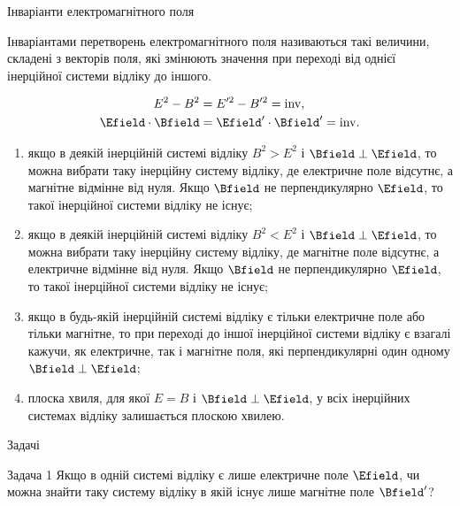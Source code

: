 \documentclass[]{beamer}
\begin{document}
\begin{frame}{Інваріанти електромагнітного поля}{}
	\begin{block}{}\justifying\small
		Інваріантами перетворень електромагнітного поля називаються такі величини, складені з векторів поля, які змінюють значення при переході від однієї інерційної системи відліку до іншого.
	\end{block}
	\begin{tcolorbox}[sharp corners, colframe=blue!50!black, colback=white,  top=0pt]
		{\color{blue}
			\begin{align*}
				E^2 - B^2           & = E'^2 - B'^2 = \mathrm{inv},           \\
				\Efield\cdot\Bfield & = \Efield'\cdot\Bfield' = \mathrm{inv}.
			\end{align*}
		}
	\end{tcolorbox}
	\begin{enumerate}\footnotesize
		\item якщо в деякій інерційній системі відліку {\color{red} $ B^2 > E^2 $}  і {\color{blue} $ \Bfield \perp \Efield $}, то можна вибрати таку інерційну систему відліку, де електричне поле відсутнє, а магнітне відмінне від нуля. Якщо $ \Bfield $ не перпендикулярно $ \Efield $, то такої інерційної системи відліку не існує;
		\item  якщо в деякій інерційній системі відліку {\color{red} $ B^2 < E^2 $} і {\color{blue} $ \Bfield \perp \Efield $}, то можна вибрати таку інерційну систему відліку, де магнітне поле відсутнє, а електричне відмінне від нуля. Якщо $ \Bfield $ не перпендикулярно $ \Efield $, то такої інерційної системи відліку не існує;
		\item якщо в будь-якій інерційній системі відліку є тільки електричне поле або тільки магнітне, то при переході до іншої інерційної системи відліку є взагалі кажучи, як електричне, так і магнітне поля, які перпендикулярні один одному {\color{red} $ \Bfield \perp \Efield $};
		\item плоска хвиля, для якої {\color{red} $ E = B $} і {\color{blue} $ \Bfield \perp \Efield $}, у всіх інерційних системах відліку  залишається плоскою хвилею.
	\end{enumerate}{}


\end{frame}


\begin{frame}{Задачі}{}
	\begin{exampleblock}{Задача 1}
		Якщо в одній системі відліку є лише електричне поле $ \Efield $, чи можна знайти таку систему відліку в якій існує лише магнітне поле $ \Bfield'
		$?
	\end{exampleblock}
\end{frame}
\end{document}
